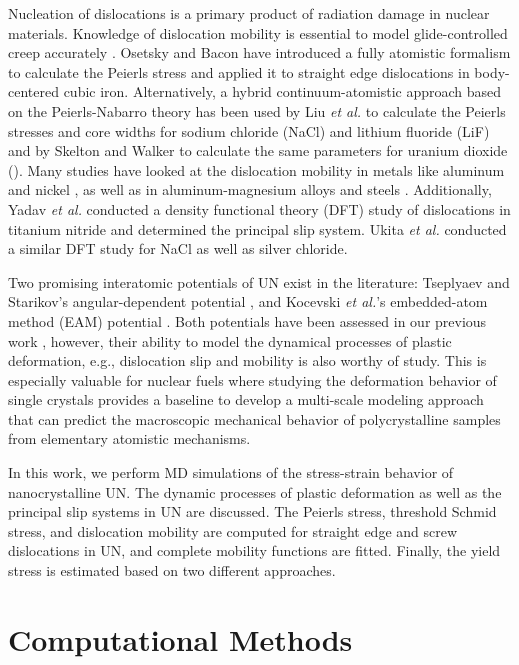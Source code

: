 \documentclass[applsci,article,submit,pdftex,moreauthors]{Definitions/mdpi}
\newcommand{\?}{\stackrel{?}{=}}
\begin{document}
Nucleation of dislocations is a primary product of radiation damage in nuclear materials. Knowledge of dislocation mobility is essential to model glide-controlled creep accurately \cite{Skelton2017}. Osetsky and Bacon \cite{Osetsky2003} have introduced a fully atomistic formalism to calculate the Peierls stress and applied it to straight edge dislocations in body-centered cubic iron. Alternatively, a hybrid continuum-atomistic approach based on the Peierls-Nabarro theory has been used by Liu \textit{et al.} \cite{Liu2012} to calculate the Peierls stresses and core widths for sodium chloride (NaCl) and lithium fluoride (LiF) and by Skelton and Walker \cite{Skelton2017} to calculate the same parameters for uranium dioxide (). Many studies have looked at the dislocation mobility in metals like aluminum \cite{Cho2017, Dang2019} and nickel \cite{Olmsted2005}, as well as in aluminum-magnesium alloys \cite{Olmsted2005} and steels \cite{Kaloni2023}. Additionally, Yadav \textit{et al.} \cite{Yadav2014} conducted a density functional theory (DFT) study of dislocations in titanium nitride and determined the principal slip system. Ukita \textit{et al.} \cite{Ukita2018} conducted a similar DFT study for NaCl as well as silver chloride.

Two promising interatomic potentials of UN exist in the literature: Tseplyaev and Starikov's angular-dependent potential \cite{Tseplyaev2016}, and Kocevski \textit{et al.}'s embedded-atom method (EAM) potential \cite{Kocevski2022II}. Both potentials have been assessed in our previous work \cite{AbdulHameed2024}, however, their ability to model the dynamical processes of plastic deformation, e.g., dislocation slip and mobility is also worthy of study. This is especially valuable for nuclear fuels where studying the deformation behavior of single crystals provides a baseline to develop a multi-scale modeling approach that can predict the macroscopic mechanical behavior of polycrystalline samples from elementary atomistic mechanisms.

In this work, we perform MD simulations of the stress-strain behavior of nanocrystalline UN. The dynamic processes of plastic deformation as well as the principal slip systems in UN are discussed. The Peierls stress, threshold Schmid stress, and dislocation mobility are computed for straight edge and screw dislocations in UN, and complete mobility functions are fitted. Finally, the yield stress is estimated based on two different approaches.

\section{Computational Methods}
\end{document}
